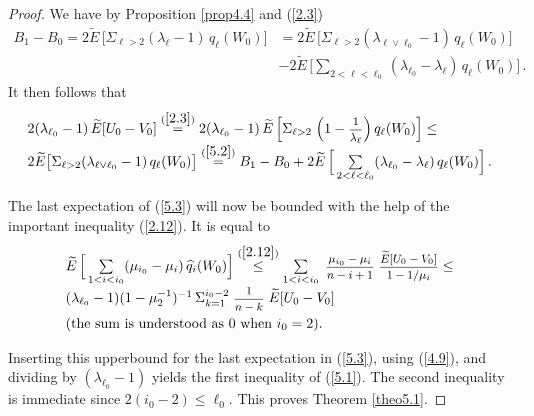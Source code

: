 \documentclass[12pt,leqno]{article}
\def\n{\noindent}
\def\dis{\displaystyle}
\def\f{\footnotesize}
\def\wh{\widehat}
\def\wt{\widetilde}
\begin{document}
\begin{proof}
We have by Proposition \ref{prop4.4} and (\ref{2.3})
\begin{equation}\label{5.2}
\begin{split}
B_1 - B_0 = 2 \wt{E} \,\big[\Sigma_{\ell > 2} (\lambda_\ell - 1) \, q_\ell(W_0)] & = 2 \wt{E} \,\big[ \Sigma_{\ell > 2} (\lambda_{\ell \vee \ell_0} -1) \, q_\ell (W_0)\big]
\\[1ex]
& - 2 \wt{E} \,\Big[ \sum_{2 < \ell < \ell_0} (\lambda_{\ell_0} - \lambda_\ell)\, q_\ell (W_0)\Big]\,.
\end{split}
\end{equation}
It then follows that
\begin{equation}\label{5.3}
\begin{array}{l}
2 ( \lambda_{\ell_0} -1 ) \, \wt{E} [ U_0 - V_0] \stackrel{(\ref{2.3})}{=} 2 (\lambda_{\ell_0} - 1) \, \wt{E} \,\Big[ \Sigma_{\ell > 2} \; \Big( 1 - \mbox{\f $\dis\frac{1}{\lambda_\ell}$}\Big) \, q_\ell (W_0)\Big] \le
\\[1ex]
2 \wt{E} \big[ \Sigma_{\ell > 2} (\lambda_{\ell \vee \ell_0} -1) \, q_\ell (W_0)\big]  \stackrel{(\ref{5.2})}{=} B_1 - B_0 + 2 \wt{E}\, \Big[\sum\limits_{2 < \ell < \ell_0} (\lambda_{\ell_0} - \lambda_\ell)\, q_\ell (W_0)\Big]\,.
\end{array}
\end{equation}

\n
The last expectation of (\ref{5.3}) will now be bounded with the help of the important inequality (\ref{2.12}). It is equal to
\begin{equation}\label{5.4}
\begin{array}{l}
\wt{E} \, \Big[\sum\limits_{1 < i < i_0} (\mu_{i_0} - \mu_i) \, \wh{q}_i (W_0)\Big] \stackrel{(\ref{2.12})}{\le} \sum\limits_{1< i < i_0} \; \mbox{\f $\dis\frac{\mu_{i_0} - \mu_i}{n - i + 1}$} \; \mbox{\f $\dis\frac{\wt{E} [U_0 - V_0]}{1 - 1/\mu_i}$} \le
\\[2ex]
(\lambda_{\ell_0}-1) (1 - \mu_2^{-1})^{-1} \, \Sigma^{i_0 -2 }_{k=1} \; \mbox{\f $\dis\frac{1}{n-k}$} \; \wt{E} [U_0 - V_0]
\\[1.5ex]
 \mbox{(the sum is understood as $0$ when $i_0 = 2$)}.
\end{array}
\end{equation}

\n
Inserting this upperbound for the last expectation in (\ref{5.3}), using (\ref{4.9}), and dividing by $(\lambda_{\ell_0} -1)$ yields the first inequality of (\ref{5.1}). The second inequality is immediate since $2(i_0 - 2) \le \ell_0$. This proves Theorem \ref{theo5.1}.
\end{proof}
\end{document}
